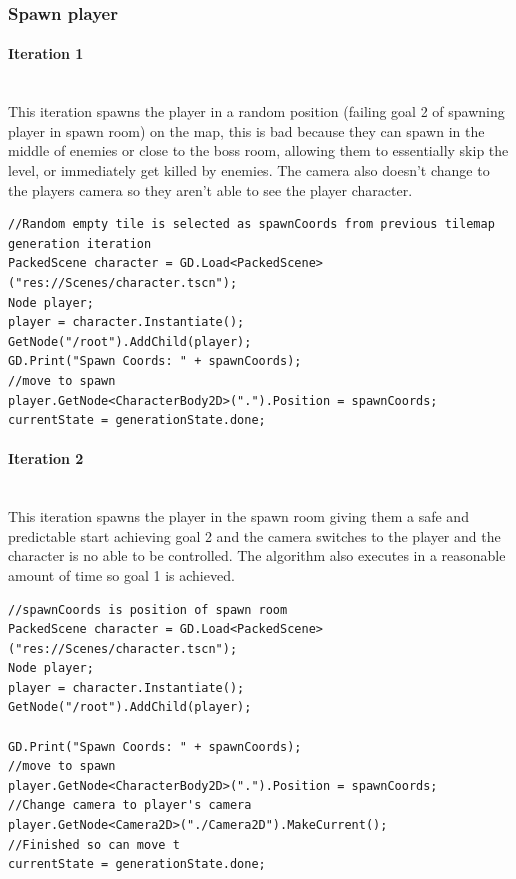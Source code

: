 \documentclass{article}
\newcommand{\myparagraph}[1]{\paragraph{#1}\mbox{}\\} %
\begin{document}
\subsubsection{Spawn player}
\myparagraph{Iteration 1}
This iteration spawns the player in a  random position (failing goal 2 of spawning player in spawn room) on the map, this is bad because they can spawn in the middle of enemies or close to the boss room, allowing them to essentially skip the level, or immediately get killed by enemies. The camera also doesn't change to the players camera so they aren't able to see the player character.
\begin{lstlisting}
//Random empty tile is selected as spawnCoords from previous tilemap generation iteration
PackedScene character = GD.Load<PackedScene>("res://Scenes/character.tscn");
Node player;
player = character.Instantiate();
GetNode("/root").AddChild(player);
GD.Print("Spawn Coords: " + spawnCoords);
//move to spawn
player.GetNode<CharacterBody2D>(".").Position = spawnCoords;
currentState = generationState.done;
\end{lstlisting}

\myparagraph{Iteration 2}
This iteration spawns the player in the spawn room giving them a safe and predictable start achieving goal 2 and the camera switches to the player and the character is no able to be controlled. The algorithm also executes in a reasonable amount of time so goal 1 is achieved.
\begin{lstlisting}
//spawnCoords is position of spawn room
PackedScene character = GD.Load<PackedScene>("res://Scenes/character.tscn");
Node player;
player = character.Instantiate();
GetNode("/root").AddChild(player);

GD.Print("Spawn Coords: " + spawnCoords);
//move to spawn
player.GetNode<CharacterBody2D>(".").Position = spawnCoords;
//Change camera to player's camera
player.GetNode<Camera2D>("./Camera2D").MakeCurrent();
//Finished so can move t
currentState = generationState.done;
\end{lstlisting}

\newpage
\printbibliography
\end{document}
